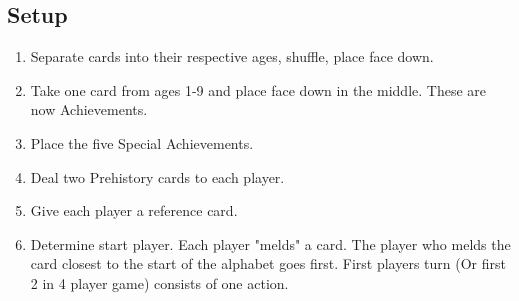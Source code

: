 \documentclass[12pt]{article}
\newenvironment{enumerateCustom}
{\begin{enumerate}
  \setlength{\itemsep}{1pt}
  \setlength{\parskip}{0pt}
  \setlength{\parsep}{0pt}}
{\end{enumerate}}
\begin{document}
\begin{mdframed}[style = customFrame]
\begin{multicols*}{2}

\section*{Setup}
\begin{enumerateCustom}
	\item Separate cards into their respective ages, shuffle, place face down.
	\item Take one card from ages 1-9 and place face down in the middle. These are now Achievements.
	\item Place the five Special Achievements.
	\item Deal two Prehistory cards to each player.
	\item Give each player a reference card.
	\item Determine start player. Each player "melds" a card. The player who melds the card closest to the start of the alphabet goes first. First players turn (Or first 2 in 4 player game) consists of one action.
\end{enumerateCustom}

\end{multicols*}
\end{mdframed}
\end{document}
